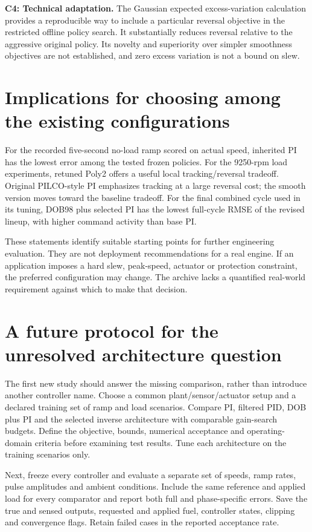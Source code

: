 \textbf{C4: Technical adaptation.} The Gaussian expected excess-variation calculation provides a reproducible way to include a particular reversal objective in the restricted offline policy search. It substantially reduces reversal relative to the aggressive original policy. Its novelty and superiority over simpler smoothness objectives are not established, and zero excess variation is not a bound on slew.

\section{Implications for choosing among the existing configurations}
For the recorded five-second no-load ramp scored on actual speed, inherited PI has the lowest error among the tested frozen policies. For the 9250-rpm load experiments, retuned Poly2 offers a useful local tracking/reversal tradeoff. Original PILCO-style PI emphasizes tracking at a large reversal cost; the smooth version moves toward the baseline tradeoff. For the final combined cycle used in its tuning, DOB98 plus selected PI has the lowest full-cycle RMSE of the revised lineup, with higher command activity than base PI.

These statements identify suitable starting points for further engineering evaluation. They are not deployment recommendations for a real engine. If an application imposes a hard slew, peak-speed, actuator or protection constraint, the preferred configuration may change. The archive lacks a quantified real-world requirement against which to make that decision.

\section{A future protocol for the unresolved architecture question}
The first new study should answer the missing comparison, rather than introduce another controller name. Choose a common plant/sensor/actuator setup and a declared training set of ramp and load scenarios. Compare PI, filtered PID, DOB plus PI and the selected inverse architecture with comparable gain-search budgets. Define the objective, bounds, numerical acceptance and operating-domain criteria before examining test results. Tune each architecture on the training scenarios only.

Next, freeze every controller and evaluate a separate set of speeds, ramp rates, pulse amplitudes and ambient conditions. Include the same reference and applied load for every comparator and report both full and phase-specific errors. Save the true and sensed outputs, requested and applied fuel, controller states, clipping and convergence flags. Retain failed cases in the reported acceptance rate.

